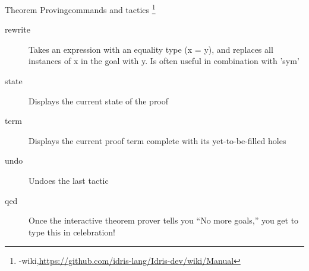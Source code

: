 \documentclass[handout]{beamer}
\begin{document}
\begin{frame}{Theorem Proving}{commands and tactics
    \footnote[frame,1]
    {\idris-wiki,\url{https://github.com/idris-lang/Idris-dev/wiki/Manual}}}
  \begin{description}
  \item[rewrite] Takes an expression with an equality type (x =
    y), and replaces all instances of x in the goal with y. Is often
    useful in combination with 'sym'
  \item[state] Displays the current state of the proof
  \item[term] Displays the current proof term complete with its
    yet-to-be-filled holes
  \item[undo] Undoes the last tactic
  \item[qed] Once the interactive theorem prover tells you ``No
    more goals,'' you get to type this in celebration!
  \end{description}
\end{frame}
\end{document}

